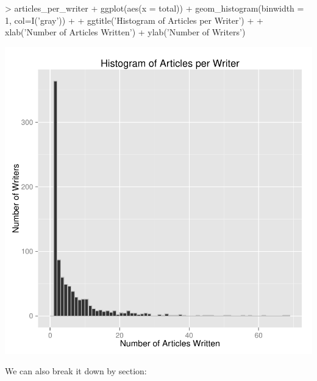 \documentclass[a4paper]{article}
\begin{document}
\begin{Schunk}
\begin{Sinput}
> articles_per_writer %
+   ggplot(aes(x = total)) + geom_histogram(binwidth = 1, col=I('gray')) +
+   ggtitle('Histogram of Articles per Writer') +
+   xlab('Number of Articles Written') + ylab('Number of Writers')
\end{Sinput}
\end{Schunk}
\includegraphics{FinalProject-018}

We can also break it down by section:
\end{document}
